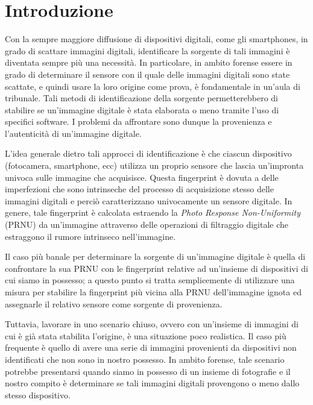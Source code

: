 \section{Introduzione}

Con la sempre maggiore diffusione di dispositivi digitali, come gli smartphones, in grado di scattare immagini digitali, identificare la sorgente di tali immagini è diventata sempre più una necessità. In particolare, in ambito forense essere in grado di determinare il sensore con il quale delle immagini digitali sono state scattate, e quindi usare la loro origine come prova, è fondamentale in un'aula di tribunale. Tali metodi di identificazione della sorgente permetterebbero di stabilire se un'immagine digitale è stata elaborata o meno tramite l'uso di specifici software. I problemi da affrontare sono dunque la provenienza e l'autenticità di un'immagine digitale.

L'idea generale dietro tali approcci di identificazione è che ciascun dispositivo (fotocamera, smartphone, ecc) utilizza un proprio sensore che lascia un'impronta univoca sulle immagine che acquisisce. Questa fingerprint è dovuta a delle imperfezioni che sono intrinseche del processo di acquisizione stesso delle immagini digitali e perciò caratterizzano univocamente un sensore digitale. In genere, tale fingerprint è calcolata estraendo la \emph{Photo Response Non-Uniformity} (PRNU) da un'immagine attraverso delle operazioni di filtraggio digitale che estraggono il rumore intrinseco nell'immagine.

Il caso più banale per determinare la sorgente di un'immagine digitale è quella di confrontare la sua PRNU con le fingerprint relative ad un'insieme di dispositivi di cui siamo in possesso; a questo punto si tratta semplicemente di utilizzare una misura per stabilire la fingerprint più vicina alla PRNU dell'immagine ignota ed assegnarle il relativo sensore come sorgente di provenienza.

Tuttavia, lavorare in uno scenario chiuso, ovvero con un'insieme di immagini di cui è già stata stabilita l'origine, è una situazione poco realistica. Il caso più frequente è quello di avere una serie di immagini provenienti da dispositivi non identificati che non sono in nostro possesso. In ambito forense, tale scenario potrebbe presentarsi quando siamo in possesso di un insieme di fotografie e il nostro compito è determinare se tali immagini digitali provengono o meno dallo stesso dispositivo.

